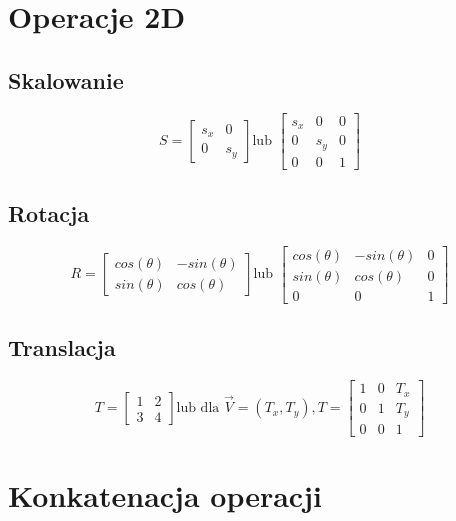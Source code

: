 \documentclass{../notatki}
\begin{document}
\section{Operacje 2D}

\subsection{Skalowanie}

$$
S = \begin{bmatrix}
        s_x & 0 \\
        0 & s_y
    \end{bmatrix}
\text{lub }
\begin{bmatrix} s_x & 0 & 0 \\ 0 & s_y & 0 \\ 0 & 0 & 1 \end{bmatrix}
$$

\subsection{Rotacja}

$$
R = \begin{bmatrix}
        cos(\theta) & -sin(\theta) \\
        sin(\theta) & cos(\theta)
    \end{bmatrix}
\text{lub }
\begin{bmatrix} cos(\theta) & -sin(\theta) & 0 \\ sin(\theta) & cos(\theta) & 0 \\ 0 & 0 & 1 \end{bmatrix}
$$

\subsection{Translacja}

$$
T = 
\begin{bmatrix}
    1 & 2 \\
    3 & 4
\end{bmatrix}
\text{lub dla } 
\vec{V}=(T_x, T_y),
T=
\begin{bmatrix} 1 & 0 & T_x \\ 0 & 1 & T_y \\ 0 & 0 & 1 \end{bmatrix}
$$

\section{Konkatenacja operacji}
\end{document}
